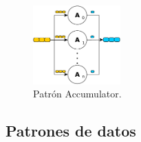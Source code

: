 \begin{itemize}
    \vspace{0.35cm}
    \begin{figure}[htb]
    \centering
    \includegraphics[width=0.30\textwidth]{figures/accumulator.pdf}
    \caption{Patrón Accumulator.}
    \label{fig:chap3:accumulator}
    \end{figure}
    \vspace{0.35cm}
    
\end{itemize}

\subsection{Patrones de datos}

